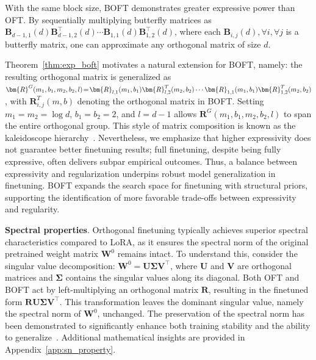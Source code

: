 \begin{theorem}\label{thm:exp_boft}
    With the same block size, BOFT demonstrates greater expressive power than OFT. By sequentially multiplying butterfly matrices as $\bm{B}_{d-1,1}(d)\bm{B}^\top_{d-1,2}(d)\cdots\bm{B}_{1,1}(d)\bm{B}^\top_{1,2}(d)$, where each $\bm{B}_{i,j}(d), \forall i, \forall j$ is a butterfly matrix, one can approximate any orthogonal matrix of size $d$.
\end{theorem}

Theorem~\ref{thm:exp_boft} motivates a natural extension for BOFT, namely: the resulting orthogonal matrix is generalized as $\thickmuskip=2mu \medmuskip=2mu \bm{R}^G(m_1,b_1,m_2,b_2,l)=\bm{R}_{l,1}(m_1,b_1)\bm{R}_{l,2}^T(m_2,b_2)\cdots\bm{R}_{1,1}(m_1,b_1)\bm{R}_{1,2}^T(m_2,b_2)$, with $\bm{R}_{i,j}^T(m,b)$ denoting the orthogonal matrix in BOFT. Setting $m_1=m_2=\log d$, $b_1=b_2=2$, and $l=d-1$ allows $\bm{R}^G(m_1,b_1,m_2,b_2,l)$ to span the entire orthogonal group. This style of matrix composition is known as the kaleidoscope hierarchy~\cite{dao2019kaleidoscope}. Nevertheless, we emphasize that higher expressivity does not guarantee better finetuning results; full finetuning, despite being fully expressive, often delivers subpar empirical outcomes. Thus, a balance between expressivity and regularization underpins robust model generalization in finetuning. BOFT expands the search space for finetuning with structural priors, supporting the identification of more favorable trade-offs between expressivity and regularity.

\textbf{Spectral properties}. Orthogonal finetuning typically achieves superior spectral characteristics compared to LoRA, as it ensures the spectral norm of the original pretrained weight matrix $\bm{W}^0$ remains intact. To understand this, consider the singular value decomposition: $\bm{W}^0=\bm{U}\bm{\Sigma}\bm{V}^\top$, where $\bm{U}$ and $\bm{V}$ are orthogonal matrices and $\bm{\Sigma}$ contains the singular values along its diagonal. Both OFT and BOFT act by left-multiplying an orthogonal matrix $\bm{R}$, resulting in the finetuned form $\bm{R}\bm{U}\bm{\Sigma}\bm{V}^\top$. This transformation leaves the dominant singular value, namely the spectral norm of $\bm{W}^0$, unchanged. The preservation of the spectral norm has been demonstrated to significantly enhance both training stability and the ability to generalize~\cite{miyato2018spectral,yoshida2017spectral}. Additional mathematical insights are provided in Appendix~\ref{app:sn_property}.

